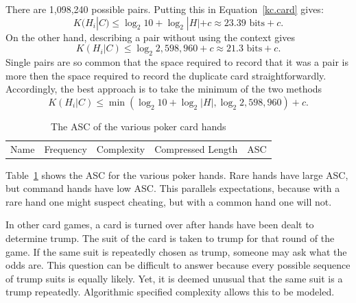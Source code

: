 There are 1,098,240 possible pairs.
Putting this in Equation~\ref{kc.card} gives:
\begin{equation}
    K(H_i|C) \leq \log_2 10 + \log_2 |H| + c \approx 23.39 \mbox{ bits} + c \mbox{.}
\end{equation}
On the other hand, describing a pair without using the context gives
\begin{equation}
    K(H_i|C) \leq \log_2 2,598,960 + c \approx 21.3 \mbox{ bits} + c \mbox{.}
\end{equation}
Single pairs are so common that the space required to record that it was a pair is more then the space required to record the duplicate card straightforwardly. 
Accordingly, the best approach is to take the minimum of the two methods
\begin{equation}
    K(H_i|C) \leq \min(\log_2 10 + \log_2 |H|, \log_2 2,598,960) + c \mbox{.}
\end{equation}

\begin{table}
    \begin{center}
    \begin{tabular}{lllll}
        Name & Frequency & Complexity & Compressed Length & ASC \\
        
    \end{tabular}
    \end{center}
    \caption{The ASC of the various poker card hands}
    \label{asc.hands}
\end{table}
Table~\ref{asc.hands} shows the ASC for the various poker hands.
Rare hands have large ASC, but command hands have low ASC.
This parallels expectations, because with a rare hand one might suspect cheating, but with a common hand one will not.

In other card games, a card is turned over after hands have been dealt to determine trump.
The suit of the card is taken to trump for that round of the game.
If the same suit is repeatedly chosen as trump, someone may ask what the odds are.
This question can be difficult to answer because every possible sequence of trump suits is equally likely.
Yet, it is deemed unusual that the same suit is a trump repeatedly.
Algorithmic specified complexity allows this to be modeled.

